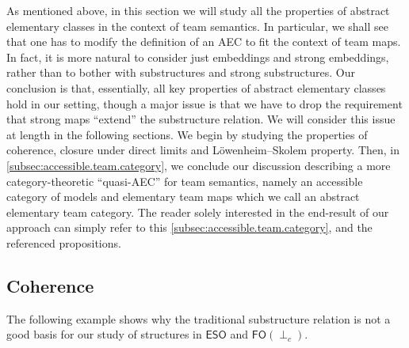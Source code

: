 \documentclass[a4paper]{amsart}
\theoremstyle{definition}
\theoremstyle{remark}
\newcommand\eso{\mathsf{ESO}}
\newcommand\foil{\mathsf{FO}(\perp_c)}
\theoremstyle{definition}
\begin{document}
As mentioned above, in this section we will study all the properties of abstract elementary classes in the context of team semantics. In particular, we shall see that one has to modify the definition of an AEC to fit the context of team maps. In fact, it is more natural to consider just embeddings and strong embeddings, rather than to bother with substructures and strong substructures. Our conclusion is that, essentially, all key properties of abstract elementary classes hold in our setting, though a major issue is that we have to drop the requirement that strong maps ``extend'' the substructure relation. We will consider this issue at length in the following sections. We begin by studying the properties of coherence, closure under direct limits and Löwenheim--Skolem property. Then, in \cref{subsec:accessible.team.category}, we conclude our discussion describing a more category-theoretic ``quasi-AEC'' for team semantics, namely an accessible category of models and elementary team maps which we call an abstract elementary team category. The reader solely interested in the end-result of our approach can simply refer to this \cref{subsec:accessible.team.category}, and the referenced propositions.



\subsection{Coherence}\label{subsec:coherence} The following example shows why the traditional substructure relation is not a good basis for our study of structures in $\eso$ and $\foil$.
\end{document}
